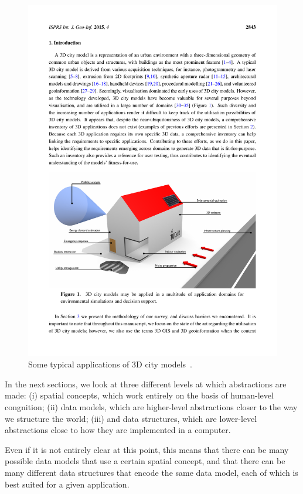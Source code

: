 \begin{figure}
\centering
\includegraphics[width=\linewidth]{figs/applications.pdf}
\caption{Some typical applications of 3D city models~\citep{Biljecki15a}.}%
\label{fig:applications}
\end{figure}

In the next sections, we look at three different levels at which abstractions are made: (i) spatial concepts, which work entirely on the basis of human-level congnition; (ii) data models, which are higher-level abstractions closer to the way we structure the world; (iii) and data structures, which are lower-level abstractions close to how they are implemented in a computer.

Even if it is not entirely clear at this point, this means that there can be many possible data models that use a certain spatial concept, and that there can be many different data structures that encode the same data model, each of which is best suited for a given application.

